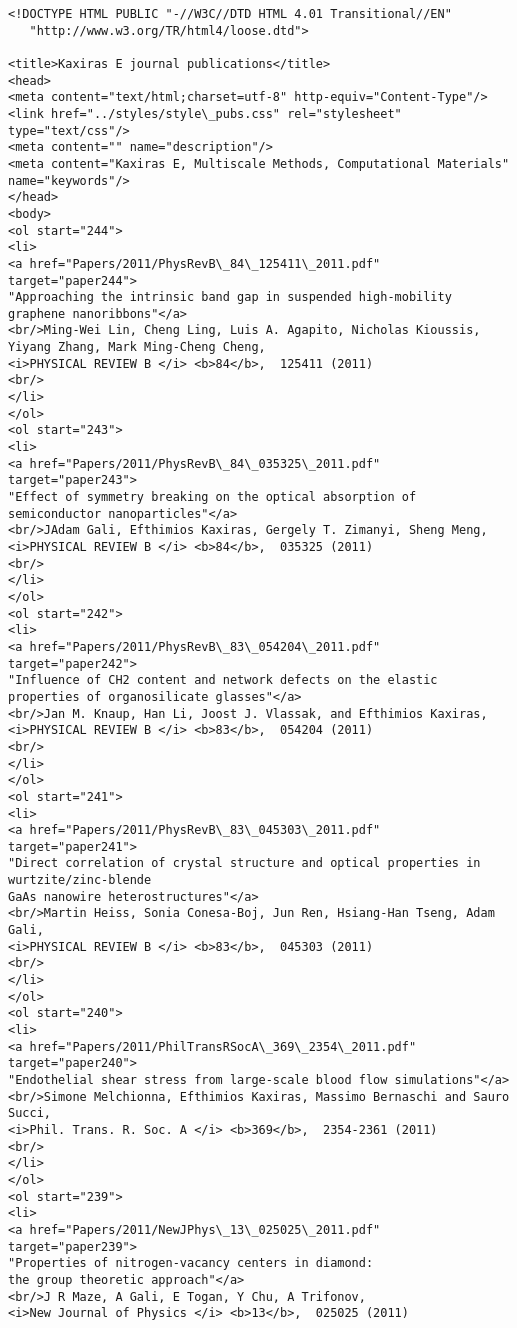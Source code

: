 \documentclass[11pt]{article}
\begin{document}
    \begin{Verbatim}[commandchars=\\\{\}]
<!DOCTYPE HTML PUBLIC "-//W3C//DTD HTML 4.01 Transitional//EN"
   "http://www.w3.org/TR/html4/loose.dtd">

<title>Kaxiras E journal publications</title>
<head>
<meta content="text/html;charset=utf-8" http-equiv="Content-Type"/>
<link href="../styles/style\_pubs.css" rel="stylesheet" type="text/css"/>
<meta content="" name="description"/>
<meta content="Kaxiras E, Multiscale Methods, Computational Materials" name="keywords"/>
</head>
<body>
<ol start="244">
<li>
<a href="Papers/2011/PhysRevB\_84\_125411\_2011.pdf" target="paper244">
"Approaching the intrinsic band gap in suspended high-mobility graphene nanoribbons"</a>
<br/>Ming-Wei Lin, Cheng Ling, Luis A. Agapito, Nicholas Kioussis, Yiyang Zhang, Mark Ming-Cheng Cheng,
<i>PHYSICAL REVIEW B </i> <b>84</b>,  125411 (2011)
<br/>
</li>
</ol>
<ol start="243">
<li>
<a href="Papers/2011/PhysRevB\_84\_035325\_2011.pdf" target="paper243">
"Effect of symmetry breaking on the optical absorption of semiconductor nanoparticles"</a>
<br/>JAdam Gali, Efthimios Kaxiras, Gergely T. Zimanyi, Sheng Meng,
<i>PHYSICAL REVIEW B </i> <b>84</b>,  035325 (2011)
<br/>
</li>
</ol>
<ol start="242">
<li>
<a href="Papers/2011/PhysRevB\_83\_054204\_2011.pdf" target="paper242">
"Influence of CH2 content and network defects on the elastic properties of organosilicate glasses"</a>
<br/>Jan M. Knaup, Han Li, Joost J. Vlassak, and Efthimios Kaxiras,
<i>PHYSICAL REVIEW B </i> <b>83</b>,  054204 (2011)
<br/>
</li>
</ol>
<ol start="241">
<li>
<a href="Papers/2011/PhysRevB\_83\_045303\_2011.pdf" target="paper241">
"Direct correlation of crystal structure and optical properties in wurtzite/zinc-blende
GaAs nanowire heterostructures"</a>
<br/>Martin Heiss, Sonia Conesa-Boj, Jun Ren, Hsiang-Han Tseng, Adam Gali,
<i>PHYSICAL REVIEW B </i> <b>83</b>,  045303 (2011)
<br/>
</li>
</ol>
<ol start="240">
<li>
<a href="Papers/2011/PhilTransRSocA\_369\_2354\_2011.pdf" target="paper240">
"Endothelial shear stress from large-scale blood flow simulations"</a>
<br/>Simone Melchionna, Efthimios Kaxiras, Massimo Bernaschi and Sauro Succi, 
<i>Phil. Trans. R. Soc. A </i> <b>369</b>,  2354-2361 (2011)
<br/>
</li>
</ol>
<ol start="239">
<li>
<a href="Papers/2011/NewJPhys\_13\_025025\_2011.pdf" target="paper239">
"Properties of nitrogen-vacancy centers in diamond:
the group theoretic approach"</a>
<br/>J R Maze, A Gali, E Togan, Y Chu, A Trifonov,
<i>New Journal of Physics </i> <b>13</b>,  025025 (2011)

\end{Verbatim}
\end{document}
